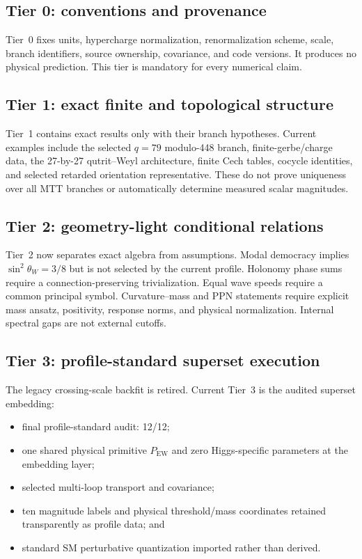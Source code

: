 \documentclass[11pt]{article}
\begin{document}
\subsection{Tier 0: conventions and provenance}

Tier~0 fixes units, hypercharge normalization, renormalization scheme, scale,
branch identifiers, source ownership, covariance, and code versions. It
produces no physical prediction. This tier is mandatory for every numerical
claim.

\subsection{Tier 1: exact finite and topological structure}

Tier~1 contains exact results only with their branch hypotheses. Current
examples include the selected $q=79$ modulo-448 branch, finite-gerbe/charge
data, the 27-by-27 qutrit--Weyl architecture, finite Cech tables, cocycle
identities, and selected retarded orientation representative. These do not
prove uniqueness over all MTT branches or automatically determine measured
scalar magnitudes.

\subsection{Tier 2: geometry-light conditional relations}

Tier~2 now separates exact algebra from assumptions. Modal democracy implies
$\sin^2\theta_W=3/8$ but is not selected by the current profile. Holonomy phase
sums require a connection-preserving trivialization. Equal wave speeds require
a common principal symbol. Curvature--mass and PPN statements require explicit
mass ansatz, positivity, response norms, and physical normalization. Internal
spectral gaps are not external cutoffs.

\subsection{Tier 3: profile-standard superset execution}

The legacy crossing-scale backfit is retired. Current Tier~3 is the audited
superset embedding:
\begin{itemize}
\item final profile-standard audit: 12/12;
\item one shared physical primitive $P_{\mathrm{EW}}$ and zero
Higgs-specific parameters at the embedding layer;
\item selected multi-loop transport and covariance;
\item ten magnitude labels and physical threshold/mass coordinates retained
transparently as profile data; and
\item standard SM perturbative quantization imported rather than derived.
\end{itemize}
\end{document}
